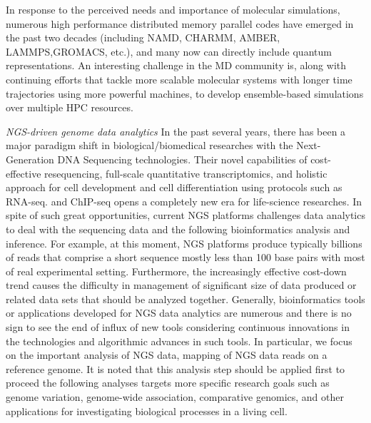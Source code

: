 \documentclass{sig-alternate}
\begin{document}

In response to the perceived needs and importance of molecular
simulations, numerous high performance distributed memory parallel codes
have emerged in the past two decades (including NAMD, CHARMM, AMBER,
LAMMPS,GROMACS, etc.), and many now can
directly include quantum representations.  An interesting challenge in the MD community is, along with continuing efforts that tackle more scalable molecular systems with longer time trajectories using more powerful machines, to develop ensemble-based simulations over multiple HPC resources.  

\textit{NGS-driven genome data analytics}
In the past several years, there has been a major paradigm shift in biological/biomedical researches with the Next-Generation DNA Sequencing technologies\cite{mardis2008-tig,metzker2010,mardis2008-arghg}.  Their novel capabilities of cost-effective resequencing, full-scale quantitative transcriptomics, and holistic approach for cell development and cell differentiation using protocols such as RNA-seq. and ChIP-seq opens a completely new era for life-science researches\cite{sorek2010,mortazavi2008}.  In spite of such great opportunities, current NGS platforms challenges data analytics to deal with the sequencing data and the following bioinformatics analysis and inference.  For example, at this moment, NGS platforms produce typically billions of reads that comprise a short sequence mostly less than 100 base pairs with most of real experimental setting\cite{alex2009,trapnell2009}.  Furthermore, the increasingly effective cost-down trend causes the difficulty in management of significant size of data produced or related data sets that should be analyzed together.  
Generally, bioinformatics tools or applications developed for NGS data analytics are numerous and there is no sign to see the end of influx of new tools considering continuous innovations in the technologies and algorithmic advances in such tools.  In particular, we focus on the  important analysis of NGS data, mapping of NGS data reads on a reference genome.  It is noted that this analysis step should be applied first to proceed the following analyses targets more specific research goals such as genome variation, genome-wide association, comparative genomics, and other applications for investigating biological processes in a living cell.     
\end{document}
